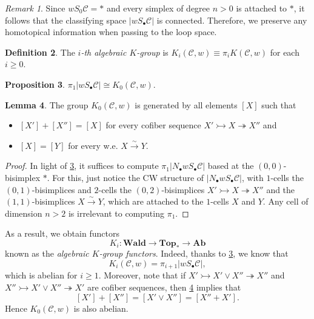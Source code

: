 \documentclass[10pt,letterpaper,cm]{nupset}
\theoremstyle{definition}
\newtheorem{definition}{Definition}
\theoremstyle{theorem}
\newtheorem{lemma}[definition]{Lemma}
\newtheorem{prop}[definition]{Proposition}
\theoremstyle{remark}
\newtheorem{remark}[definition]{Remark}
\newcommand{\1}{\mathbf{1}}
\renewcommand{\c}{\mathscr{C}}
\newcommand{\0}{\vec 0}
\begin{document}
\begin{remark}
Since $wS_0 \c = \ast$ and every simplex of degree $n >0$ is attached to $\ast$, it follows that the classifying space $\lvert{w S_{\bullet} \c}\rvert$ is connected. Therefore, we preserve any homotopical information when passing to the loop space.
\end{remark}

\begin{definition}
The \textit{$i$-th algebraic $K$-group} is $K_i(\c, w) \equiv \pi_iK(\c, w)$ for each $i\geq 0$. 
\end{definition}

\begin{prop}\label{P4}
$\pi_1\lvert{w S_{\bullet} \c}\rvert \cong K_0(\c, w)$.
\end{prop}

\begin{lemma}\label{L8}
The group $K_0(\c, w)$ is generated by all elements $\left[X\right]$ such that 
\begin{itemize}
\item $\left[X'\right] + \left[X''\right] = \left[X\right]$ for every cofiber sequence $X' \rightarrowtail X \twoheadrightarrow X''$ and
\item  $\left[X\right] = \left[Y\right]$ for every w.e. $X \overset{\sim}{\longrightarrow} Y$.
\end{itemize}
\end{lemma}
\begin{proof}
In light of \cref{P4}, it suffices to compute $\pi_1\lvert{N_{\bullet}w S_{\bullet} \c}\rvert$ based at the $(0,0)$-bisimplex $\ast$. For this, just notice the CW structure of $\lvert{N_{\bullet}w S_{\bullet} \c}\rvert$,  with $1$-cells the $(0,1)$-bisimplices and $2$-cells the $(0,2)$-bisimplices $X' \rightarrowtail X \twoheadrightarrow X''$ and the $(1,1)$-bisimplices $X \overset{\sim}{\longrightarrow} Y$, which are attached to the $1$-cells $X$ and $Y$. Any cell of dimension $n>2$ is irrelevant to computing $\pi_1$.
\end{proof}


As a result, we obtain functors $$K_i : \mathbf{Wald} \to \mathbf{Top_{\ast}} \to \mathbf{Ab}$$ known as the \textit{algebraic $K$-group functors}. Indeed, thanks to \cref{P4}, we know that $$K_i(\c, w) = \pi_{i+1}\lvert{w S_{\bullet} \c}\rvert,$$ which is abelian for $i\geq 1$. Moreover, note that if $X' \rightarrowtail X' \vee X'' \twoheadrightarrow X''$ and $X'' \rightarrowtail X' \vee X'' \twoheadrightarrow X'$ are cofiber sequences, then \cref{L8} implies that $$\left[X'\right] + \left[X''\right] = \left[X' \vee X''\right] = \left[X'' + X'\right].$$ Hence $K_0(\c, w)$ is also abelian.
\end{document}
